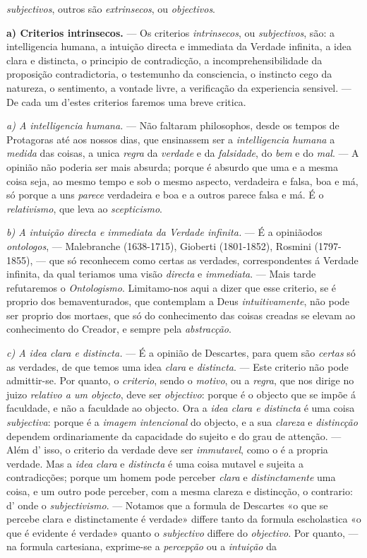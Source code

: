 \emph{subjectivos}, outros são \emph{extrinsecos}, ou \emph{objectivos}.\par \textbf{a) Criterios intrinsecos.} --- Os criterios \emph{intrinsecos}, ou \emph{subjectivos}, são: a intelligencia humana, a intuição directa e immediata da Verdade infinita, a idea clara e distincta, o principio de contradicção, a incomprehensibilidade da proposição contradictoria, o testemunho da consciencia, o instincto cego da natureza, o sentimento, a vontade livre, a verificação da experiencia sensivel. --- De cada um d'estes criterios faremos uma breve critica.\par \emph{a) A intelligencia humana.} --- Não faltaram philosophos, desde os tempos de Protagoras até aos nossos dias, que ensinassem ser a \emph{intelligencia humana} a \emph{medida} das coisas, a unica \emph{regra} da \emph{verdade} e da \emph{falsidade}, do \emph{bem} e do \emph{mal}. --- A opinião não poderia ser mais absurda; porque é absurdo que uma e a mesma coisa seja, ao mesmo tempo e sob o mesmo aspecto, verdadeira e falsa, boa e má, só porque a uns \emph{parece} verdadeira e boa e a outros parece falsa e má. É o \emph{relativismo}, que leva ao \emph{scepticismo}.\par \emph{b) A intuição directa e immediata da Verdade infinita.} --- É a opiniãodos \emph{ontologos}, --- Malebranche (1638-1715), Gioberti (1801-1852), Rosmini (1797-1855), --- que só reconhecem como certas as verdades, correspondentes á Verdade infinita, da qual teriamos uma visão \emph{directa} e \emph{immediata}. --- Mais tarde refutaremos o \emph{Ontologismo}. Limitamo-nos aqui a dizer que esse criterio, se é proprio dos bemaventurados, que contemplam a Deus \emph{intuitivamente}, não pode ser proprio dos mortaes, que só do conhecimento das coisas creadas se elevam ao conhecimento do Creador, e sempre pela \emph{abstracção}.\par \emph{c) A idea clara e distincta.} --- É a opinião de Descartes, para quem são \emph{certas} só as verdades, de que temos uma idea \emph{clara} e \emph{distincta}. --- Este criterio não pode admittir-se. Por quanto, o \emph{criterio}, sendo o \emph{motivo}, ou a \emph{regra}, que nos dirige no juizo \emph{relativo a um objecto}, deve ser \emph{objectivo}: porque é o objecto que se impõe á faculdade, e não a faculdade ao objecto. Ora a \emph{idea clara e distincta} é uma coisa \emph{subjectiva}: porque é a \emph{imagem intencional} do objecto, e a sua \emph{clareza} e \emph{distincção} dependem ordinariamente da capacidade do sujeito e do grau de attenção. --- Além d' isso, o criterio da verdade deve ser \emph{immutavel}, como o é a propria verdade. Mas a \emph{idea clara} e \emph{distincta} é uma coisa mutavel e sujeita a contradicções; porque um homem pode perceber \emph{clara} e \emph{distinctamente} uma coisa, e um outro pode perceber, com a mesma clareza e distincção, o contrario: d' onde o \emph{subjectivismo}. --- Notamos que a formula de Descartes «o que se percebe clara e distinctamente é verdade» differe tanto da formula escholastica «o que é evidente é verdade» quanto o \emph{subjectivo} differe do \emph{objectivo}. Por quanto, --- na formula cartesiana, exprime-se a \emph{percepção} ou a \emph{intuição} da 
